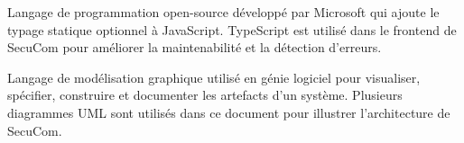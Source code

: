 \begin{description}[leftmargin=2cm, style=nextline]
\item[TypeScript] Langage de programmation open-source développé par Microsoft qui ajoute le typage statique optionnel à JavaScript. TypeScript est utilisé dans le frontend de SecuCom pour améliorer la maintenabilité et la détection d'erreurs.

\item[UML (Unified Modeling Language)] Langage de modélisation graphique utilisé en génie logiciel pour visualiser, spécifier, construire et documenter les artefacts d'un système. Plusieurs diagrammes UML sont utilisés dans ce document pour illustrer l'architecture de SecuCom.

\end{description}